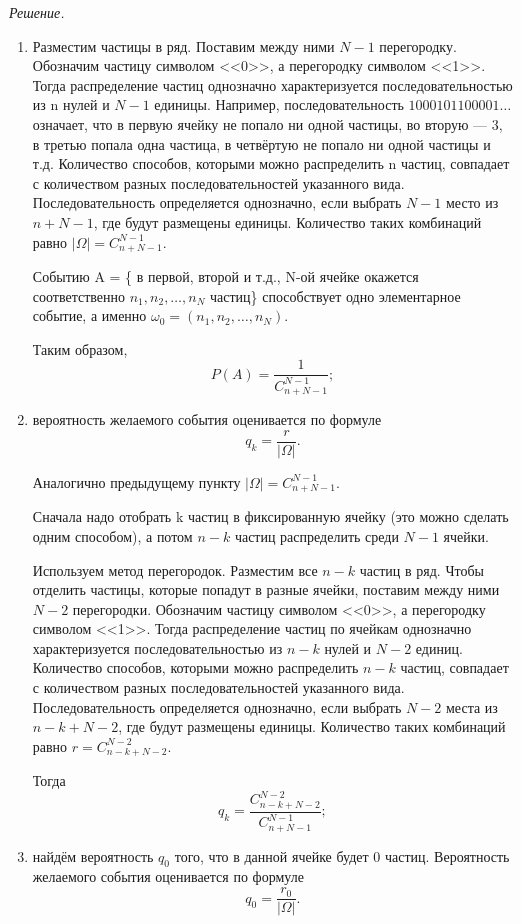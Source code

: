 \textit{Решение.}
\begin{enumerate}[label=\alph*)]
\item Разместим частицы в ряд.
Поставим между ними $ N - 1 $ перегородку.
Обозначим частицу символом <<0>>, а перегородку символом <<1>>.
Тогда распределение частиц однозначно характеризуется последовательностью из n нулей и $ N - 1 $ единицы.
Например, последовательность
$ 1000101100001 \dotsc $
означает, что в первую ячейку не попало ни одной частицы, во вторую --- 3, в третью попала одна частица, в четвёртую не попало ни одной частицы и т.д.
Количество способов, которыми можно распределить n частиц, совпадает с количеством разных последовательностей указанного вида.
Последовательность определяется однозначно, если выбрать $ N - 1 $ место из $ n + N - 1$, где будут размещены единицы.
Количество таких комбинаций равно $ | \Omega | = C_{n+N-1}^{N-1} $.

Событию A = \{ в первой, второй и т.д., N-ой ячейке окажется соответственно $ n_1, n_2, \dotsc , n_N $ частиц\}
способствует одно элементарное событие, а именно
$ \omega_0 = \left( n_1, n_2, \dotsc , n_N \right) $.

Таким образом,
$$ P(A) =
\frac{1}{C_{n+N-1}^{N-1}};$$

\item вероятность желаемого события оценивается по формуле
$$ q_k =
\frac{r}{| \Omega |}.$$

Аналогично предыдущему пункту $  | \Omega | = C_{n+N-1}^{N-1}  $.

Сначала надо отобрать k частиц в фиксированную ячейку (это можно сделать одним способом), а потом
$ n - k $
частиц распределить среди
$ N - 1 $ ячейки.

Используем метод перегородок.
Разместим все $ n - k $ частиц в ряд.
Чтобы отделить частицы, которые попадут в разные ячейки, поставим между ними $ N - 2 $ перегородки.
Обозначим частицу символом <<0>>, а перегородку символом <<1>>.
Тогда распределение частиц по ячейкам однозначно характеризуется последовательностью из $ n - k $ нулей и $ N - 2$ единиц.
Количество способов, которыми можно распределить
$ n - k $
частиц, совпадает с количеством разных последовательностей указанного вида.
Последовательность определяется однозначно, если выбрать $ N - 2 $ места из $ n - k + N - 2 $, где будут размещены единицы.
Количество таких комбинаций равно $ r = C_{n-k+N-2}^{N-2} $.

Тогда
$$ q_k =
\frac{C_{n-k+N-2}^{N-2}}{C_{n+N-1}^{N-1}};$$

\item найдём вероятность $ q_0 $ того, что в данной ячейке будет 0 частиц.
Вероятность желаемого события оценивается по формуле
$$ q_0 =
\frac{r_0}{| \Omega |}.$$


\end{enumerate}
